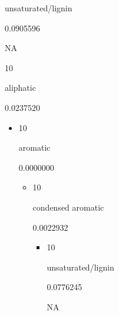 \documentclass[
]{article}
\begin{document}
\begin{itemize}
\begin{itemize}
\begin{itemize}
\begin{itemize}
\begin{itemize}
\begin{itemize}
\begin{itemize}
\begin{itemize}
\begin{itemize}
\begin{itemize}
\begin{itemize}
\begin{itemize}
\begin{itemize}
\begin{itemize}
                            unsaturated/lignin

                            0.0905596

                            NA

                            10

                            aliphatic

                            0.0237520

                            \begin{itemize}
                            \item
                              10

                              aromatic

                              0.0000000

                              \begin{itemize}
                              \item
                                10

                                condensed aromatic

                                0.0022932

                                \begin{itemize}
                                \item
                                  10

                                  unsaturated/lignin

                                  0.0776245

                                  NA
                                \end{itemize}
                              \end{itemize}
                            \end{itemize}
                          \end{itemize}
                        \end{itemize}
                      \end{itemize}
                    \end{itemize}
                  \end{itemize}
                \end{itemize}
              \end{itemize}
            \end{itemize}
          \end{itemize}
        \end{itemize}
      \end{itemize}
    \end{itemize}
  \end{itemize}
\end{itemize}
\end{document}

